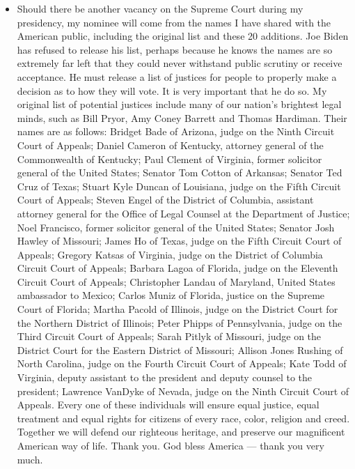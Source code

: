 \begin{itemize}
\tightlist
\item
  Should there be another vacancy on the Supreme Court during my
  presidency, my nominee will come from the names I have shared with the
  American public, including the original list and these 20 additions.
  Joe Biden has refused to release his list, perhaps because he knows
  the names are so extremely far left that they could never withstand
  public scrutiny or receive acceptance. He must release a list of
  justices for people to properly make a decision as to how they will
  vote. It is very important that he do so. My original list of
  potential justices include many of our nation's brightest legal minds,
  such as Bill Pryor, Amy Coney Barrett and Thomas Hardiman. Their names
  are as follows: Bridget Bade of Arizona, judge on the Ninth Circuit
  Court of Appeals; Daniel Cameron of Kentucky, attorney general of the
  Commonwealth of Kentucky; Paul Clement of Virginia, former solicitor
  general of the United States; Senator Tom Cotton of Arkansas; Senator
  Ted Cruz of Texas; Stuart Kyle Duncan of Louisiana, judge on the Fifth
  Circuit Court of Appeals; Steven Engel of the District of Columbia,
  assistant attorney general for the Office of Legal Counsel at the
  Department of Justice; Noel Francisco, former solicitor general of the
  United States; Senator Josh Hawley of Missouri; James Ho of Texas,
  judge on the Fifth Circuit Court of Appeals; Gregory Katsas of
  Virginia, judge on the District of Columbia Circuit Court of Appeals;
  Barbara Lagoa of Florida, judge on the Eleventh Circuit Court of
  Appeals; Christopher Landau of Maryland, United States ambassador to
  Mexico; Carlos Muniz of Florida, justice on the Supreme Court of
  Florida; Martha Pacold of Illinois, judge on the District Court for
  the Northern District of Illinois; Peter Phipps of Pennsylvania, judge
  on the Third Circuit Court of Appeals; Sarah Pitlyk of Missouri, judge
  on the District Court for the Eastern District of Missouri; Allison
  Jones Rushing of North Carolina, judge on the Fourth Circuit Court of
  Appeals; Kate Todd of Virginia, deputy assistant to the president and
  deputy counsel to the president; Lawrence VanDyke of Nevada, judge on
  the Ninth Circuit Court of Appeals. Every one of these individuals
  will ensure equal justice, equal treatment and equal rights for
  citizens of every race, color, religion and creed. Together we will
  defend our righteous heritage, and preserve our magnificent American
  way of life. Thank you. God bless America --- thank you very much.
\end{itemize}

